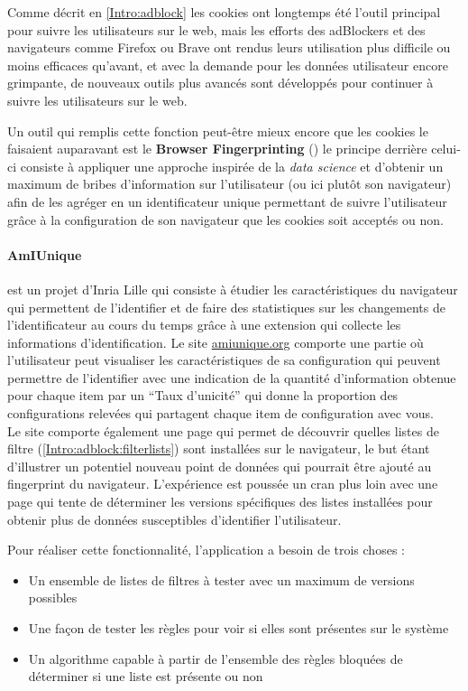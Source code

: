 \documentclass[oneside,a4paper,12pt]{article}
\begin{document}
Comme décrit en \ref{Intro:adblock} les cookies ont longtemps été l'outil principal pour suivre les utilisateurs sur le web, mais les efforts des adBlockers et des navigateurs comme Firefox ou Brave ont rendus leurs utilisation plus difficile ou moins efficaces qu'avant, et avec la demande pour les données utilisateur encore grimpante, de nouveaux outils plus avancés sont développés pour continuer à suivre les utilisateurs sur le web. 

Un outil qui remplis cette fonction peut-être mieux encore que les cookies le faisaient auparavant est le \textbf{Browser Fingerprinting} (\cite{fingerprinting}) le principe derrière celui-ci consiste à appliquer une approche inspirée de la \textit{data science} et d'obtenir un maximum de bribes d'information sur l'utilisateur (ou ici plutôt son navigateur) afin de les agréger en un identificateur unique permettant de suivre l'utilisateur grâce à la configuration de son navigateur que les cookies soit acceptés ou non.

\paragraph*{AmIUnique} est un projet d'Inria Lille qui consiste à étudier les caractéristiques du navigateur qui permettent de l'identifier et de faire des statistiques sur les changements de l'identificateur au cours du temps grâce à une extension qui collecte les informations d'identification. Le site \href{https://www.amiunique.org}{amiunique.org} comporte une partie où l'utilisateur peut visualiser les caractéristiques de sa configuration qui peuvent permettre de l'identifier avec une indication de la quantité d'information obtenue pour chaque item par un ``Taux d'unicité'' qui donne la proportion des configurations relevées qui partagent chaque item de configuration avec vous.\\

Le site comporte également une page qui permet de découvrir quelles listes de filtre (\ref{Intro:adblock:filterlists}) sont installées sur le navigateur, le but étant d'illustrer un potentiel nouveau point de données qui pourrait être ajouté au fingerprint du navigateur. L'expérience est poussée un cran plus loin avec une page qui tente de déterminer les versions spécifiques des listes installées pour obtenir plus de données susceptibles d'identifier l'utilisateur.

Pour réaliser cette fonctionnalité, l'application a besoin de trois choses :
\begin{itemize}
	\item Un ensemble de listes de filtres à tester avec un maximum de versions possibles
	\item Une façon de tester les règles pour voir si elles sont présentes sur le système
	\item Un algorithme capable à partir de l'ensemble des règles bloquées de déterminer si une liste est présente ou non
\end{itemize}
\end{document}
